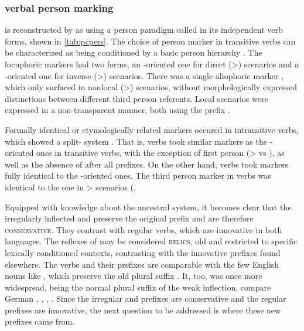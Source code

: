 \subsubsection{\PC verbal person marking}
\label{sec:pc_person}
\PC is reconstructed by \textcite{gildea1998} as using a person paradigm called \setone in its independent verb forms, shown in \cref{tab:pcpers}.
The choice of person marker in transitive verbs can be characterized as being conditioned by a basic person hierarchy .
The locuphoric markers had two forms, an -oriented one for direct (>) scenarios and a -oriented one for inverse (>) scenarios.
There was a single aliophoric marker , which only surfaced in nonlocal (>) scenarios, without morphologically expressed distinctions between different third person referents.
Local scenarios were expressed in a non-transparent manner, both using the  prefix .



Formally identical or etymologically related markers occured in intransitive verbs, which showed a split- system .
That is,  verbs took similar markers as the -oriented ones in transitive verbs, with the exception of first person (>  vs  ), as well as the absence of  after all  prefixes.
On the other hand,  verbs took markers fully identical to the -oriented ones.
The third person marker in  verbs was identical to the one in > scenarios (.

Equipped with knowledge about the ancestral system, it becomes clear that the irregularly inflected \hixka and \trio  preserve the original \PC {} prefix  and are therefore \textsc{conservative}.
They contrast with regular  verbs, which are innovative in both languages.
The reflexes of  may be considered \textsc{relics}, old and restricted to specific lexically conditioned contexts, contrasting with the innovative prefixes found elsewhere.
The verbs and their prefixes are comparable with the few English nouns like , which preserve the old plural suffix .
It, too, was once more widespread, being the normal plural suffix of the weak inflection, compare German  ,  ,  ,  .
Since the irregular \hixka and \trio prefixes are conservative and the regular prefixes are innovative, the next question to be addressed is where these new prefixes came from.



